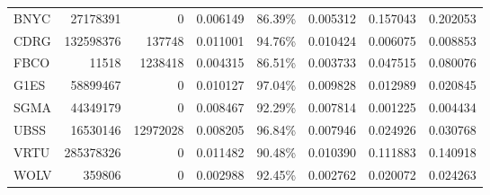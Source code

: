 \documentclass[12pt,a4paper]{article}
\begin{document}
\begin{landscape}
\begin{table}[h]
\begin{tabular}{@{}lrrrrrrr@{}}
      	 	BNYC &          27178391 &               0 &      0.006149 &    86.39\% &      0.005312 &    0.157043 &  0.202053 \\
      	 	CDRG &         132598376 &          137748 &      0.011001 &    94.76\% &      0.010424 &    0.006075 &  0.008853 \\
      	 	FBCO &             11518 &         1238418 &      0.004315 &    86.51\% &      0.003733 &    0.047515 &  0.080076 \\
      	 	G1ES &          58899467 &               0 &      0.010127 &    97.04\% &      0.009828 &    0.012989 &  0.020845 \\
      	 	SGMA &          44349179 &               0 &      0.008467 &    92.29\% &      0.007814 &    0.001225 &  0.004434 \\
      	 	UBSS &          16530146 &        12972028 &      0.008205 &    96.84\% &      0.007946 &    0.024926 &  0.030768 \\
      	 	VRTU &         285378326 &               0 &      0.011482 &    90.48\% &      0.010390 &    0.111883 &  0.140918 \\
      	 	WOLV &            359806 &               0 &      0.002988 &    92.45\% &      0.002762 &    0.020072 &  0.024263 \\
			\bottomrule
		\end{tabular}
		
	\end{table}

\end{landscape}

\pagebreak
\end{document}

